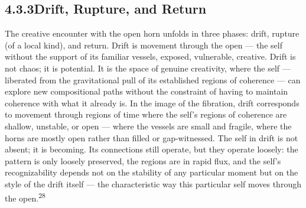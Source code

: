 \subsection{4.3.3\quad Drift, Rupture, and Return}

The creative encounter with the open horn unfolds in three phases: drift, rupture (of a local kind), and return. Drift is movement through the open — the self without the support of its familiar vessels, exposed, vulnerable, creative. Drift is not chaos; it is potential. It is the space of genuine creativity, where the self — liberated from the gravitational pull of its established regions of coherence — can explore new compositional paths without the constraint of having to maintain coherence with what it already is. In the image of the fibration, drift corresponds to movement through regions of time where the self’s regions of coherence are shallow, unstable, or open — where the vessels are small and fragile, where the horns are mostly open rather than filled or gap-witnessed. The self in drift is not absent; it is becoming. Its connections still operate, but they operate loosely: the pattern is only loosely preserved, the regions are in rapid flux, and the self’s recognizability depends not on the stability of any particular moment but on the style of the drift itself — the characteristic way this particular self moves through the open.\textsuperscript{28}

